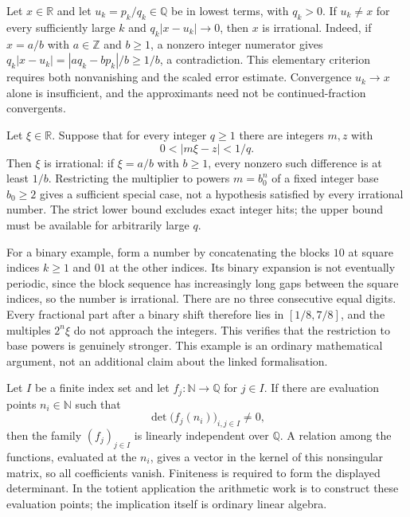 \begin{prop}\label{catalogue:cert:d1}
Let $x\in\mathbb R$ and let $u_k=p_k/q_k\in\mathbb Q$ be in lowest
terms, with $q_k>0$. If $u_k\ne x$ for every sufficiently large $k$ and
$q_k|x-u_k|\to0$, then $x$ is irrational. Indeed, if $x=a/b$ with
$a\in\mathbb Z$ and $b\ge1$, a nonzero integer numerator gives
$q_k|x-u_k|=|a q_k-b p_k|/b\ge1/b$, a contradiction.
This elementary criterion requires both nonvanishing and the scaled
error estimate. Convergence $u_k\to x$ alone is insufficient, and the
approximants need not be continued-fraction convergents.
\end{prop}

\begin{prop}\label{catalogue:cert:d2}
Let $\xi\in\mathbb R$. Suppose that for every integer $q\ge1$ there
are integers $m,z$ with
\[
 0<|m\xi-z|<1/q.
\]
Then $\xi$ is irrational: if $\xi=a/b$ with $b\ge1$, every nonzero
such difference is at least $1/b$. Restricting the multiplier to powers
$m=b_0^n$ of a fixed integer base $b_0\ge2$ gives a sufficient special
case, not a hypothesis satisfied by every irrational number.
The strict lower bound excludes exact integer hits; the upper bound must
be available for arbitrarily large $q$.

For a binary example, form a number by concatenating the blocks $10$ at
square indices $k\ge1$ and $01$ at the other indices. Its binary expansion
is not eventually periodic, since the block sequence has increasingly
long gaps between the square indices, so the number is irrational. There
are no three consecutive equal digits. Every fractional part after a
binary shift therefore lies in $[1/8,7/8]$, and the multiples $2^n\xi$
do not approach the integers. This verifies that the restriction to
base powers is genuinely stronger. This example is an ordinary mathematical
argument, not an additional claim about the linked formalisation.
\end{prop}

\begin{prop}\label{catalogue:cert:d3}
Let $I$ be a finite index set and let $f_j:\mathbb N\to\mathbb Q$
for $j\in I$. If there are evaluation points $n_i\in\mathbb N$ such that
\[
 \det\bigl(f_j(n_i)\bigr)_{i,j\in I}\ne0,
\]
then the family $(f_j)_{j\in I}$ is linearly independent over $\mathbb Q$.
A relation among the functions, evaluated at the $n_i$, gives a vector
in the kernel of this nonsingular matrix, so all coefficients vanish.
Finiteness is required to form the displayed determinant. In the totient
application the arithmetic work is to construct these evaluation points;
the implication itself is ordinary linear algebra.
\end{prop}


